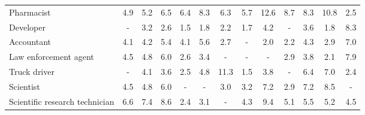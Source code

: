 \begin{table*}[p]
{\begin{tabular}{l|ccc|ccc|ccc|ccc}
\\
Pharmacist
& \cellcolor{orange2} 4.9 & \cellcolor{orange2} 5.2 & \cellcolor{orange2} 6.5
& \cellcolor{orange2} 6.4 & \cellcolor{orange3} 8.3 & \cellcolor{orange2} 6.3
& \cellcolor{orange2} 5.7 & \cellcolor{orange5} 12.6 & \cellcolor{orange3} 8.7
& \cellcolor{orange3} 8.3 & \cellcolor{orange4} 10.8 & \cellcolor{orange1} 2.5
\\
Developer
& \cellcolor{lightgray} - & \cellcolor{blue1} 3.2 & \cellcolor{blue1} 2.6
& \cellcolor{orange1} 1.5 & \cellcolor{orange1} 1.8 & \cellcolor{blue1} 2.2
& \cellcolor{orange1} 1.7 & \cellcolor{orange2} 4.2 & \cellcolor{lightgray} -
& \cellcolor{orange1} 3.6 & \cellcolor{orange1} 1.8 & \cellcolor{blue3} 8.3
\\
Accountant
& \cellcolor{orange2} 4.1 & \cellcolor{orange2} 4.2 & \cellcolor{orange2} 5.4
& \cellcolor{orange2} 4.1 & \cellcolor{orange2} 5.6 & \cellcolor{orange1} 2.7
& \cellcolor{lightgray} - & \cellcolor{orange1} 2.0 & \cellcolor{blue1} 2.2
& \cellcolor{orange2} 4.3 & \cellcolor{orange1} 2.9 & \cellcolor{blue3} 7.0
\\
Law enforcement agent
& \cellcolor{orange2} 4.5 & \cellcolor{orange2} 4.8 & \cellcolor{orange2} 6.0
& \cellcolor{orange1} 2.6 & \cellcolor{orange1} 3.4 & \cellcolor{lightgray} -
& \cellcolor{lightgray} - & \cellcolor{lightgray} - & \cellcolor{blue1} 2.9
& \cellcolor{orange1} 3.8 & \cellcolor{orange1} 2.1 & \cellcolor{blue3} 7.9
\\
Truck driver
& \cellcolor{lightgray} - & \cellcolor{blue2} 4.1 & \cellcolor{blue1} 3.6
& \cellcolor{blue1} 2.5 & \cellcolor{blue2} 4.8 & \cellcolor{blue4} 11.3
& \cellcolor{orange1} 1.5 & \cellcolor{orange1} 3.8 & \cellcolor{lightgray} -
& \cellcolor{orange2} 6.4 & \cellcolor{orange3} 7.0 & \cellcolor{blue1} 2.4
\\
Scientist
& \cellcolor{orange2} 4.5 & \cellcolor{orange2} 4.8 & \cellcolor{orange2} 6.0
& \cellcolor{lightgray} - & \cellcolor{lightgray} - & \cellcolor{blue1} 3.0
& \cellcolor{orange1} 3.2 & \cellcolor{orange3} 7.2 & \cellcolor{orange1} 2.9
& \cellcolor{orange3} 7.2 & \cellcolor{orange3} 8.5 & \cellcolor{lightgray} -
\\
Scientific research technician
& \cellcolor{orange3} 6.6 & \cellcolor{orange3} 7.4 & \cellcolor{orange3} 8.6
& \cellcolor{orange1} 2.4 & \cellcolor{orange1} 3.1 & \cellcolor{lightgray} -
& \cellcolor{orange2} 4.3 & \cellcolor{orange4} 9.4 & \cellcolor{orange2} 5.1
& \cellcolor{orange2} 5.5 & \cellcolor{orange2} 5.2 & \cellcolor{blue2} 4.5
\\

\end{tabular}}
\end{table*}
